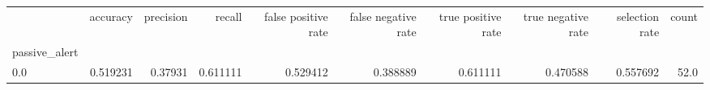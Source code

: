 \begin{tabular}{lrrrrrrrrr}
\toprule
{} &  accuracy &  precision &    recall &  false positive rate &  false negative rate &  true positive rate &  true negative rate &  selection rate &  count \\
passive\_alert &           &            &           &                      &                      &                     &                     &                 &        \\
\midrule
0.0           &  0.519231 &    0.37931 &  0.611111 &             0.529412 &             0.388889 &            0.611111 &            0.470588 &        0.557692 &   52.0 \\
\bottomrule
\end{tabular}
